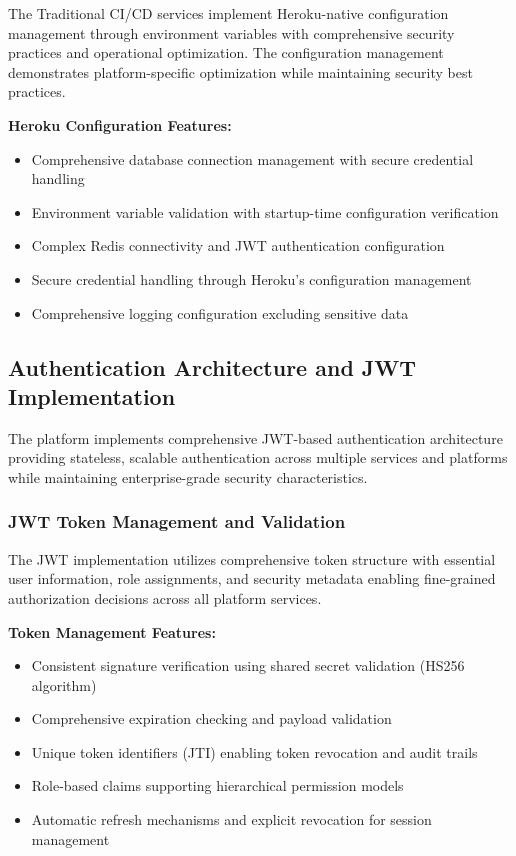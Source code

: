 The Traditional CI/CD services implement Heroku-native configuration management through environment variables with comprehensive security practices and operational optimization. The configuration management demonstrates platform-specific optimization while maintaining security best practices.

\textbf{Heroku Configuration Features:}
\begin{itemize}
\item Comprehensive database connection management with secure credential handling
\item Environment variable validation with startup-time configuration verification
\item Complex Redis connectivity and JWT authentication configuration
\item Secure credential handling through Heroku's configuration management
\item Comprehensive logging configuration excluding sensitive data
\end{itemize}

\subsection{Authentication Architecture and JWT Implementation}

The platform implements comprehensive JWT-based authentication architecture providing stateless, scalable authentication across multiple services and platforms while maintaining enterprise-grade security characteristics.

\subsubsection{JWT Token Management and Validation}

The JWT implementation utilizes comprehensive token structure with essential user information, role assignments, and security metadata enabling fine-grained authorization decisions across all platform services.

\textbf{Token Management Features:}
\begin{itemize}
\item Consistent signature verification using shared secret validation (HS256 algorithm)
\item Comprehensive expiration checking and payload validation
\item Unique token identifiers (JTI) enabling token revocation and audit trails
\item Role-based claims supporting hierarchical permission models
\item Automatic refresh mechanisms and explicit revocation for session management
\end{itemize}

